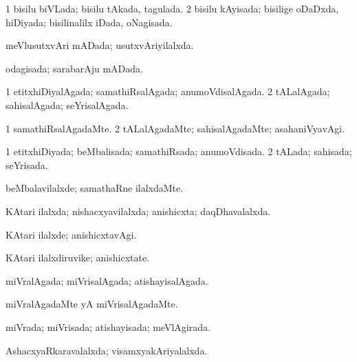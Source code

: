 \bentry
{} 
\gl{\gu}
\expl{}
\bmng
\bnum
\num{1} bisilu biVLada; bisilu tAkada, tagulada. 
\num{2} bisilu kAyisada; bisilige oDaDxda, hiDiyada; bisilinalilx iDada, oNagisada. 
\enum
\emng
\eentry

\bentry
{} 
\gl{\gu}
\expl{}
\bmng
meVlusutxvAri mADada; usutxvAriyilalxda. 
\emng
\eentry

\bentry
{} 
\gl{\gu}
\expl{}
\bmng
odagisada; sarabarAju mADada. 
\emng
\eentry

\bentry
{} 
\gl{\gu}
\expl{}
\bmng
\bnum
\num{1} etitxhiDiyalAgada; samathiRsalAgada; anumoVdisalAgada. 
\num{2} tALalAgada; sahisalAgada; seYrisalAgada. 
\enum
\emng
\eentry

\bentry
{} 
\gl{\kirxvi}
\bmng
\bnum
\num{1} samathiRsalAgadaMte. 
\num{2} tALalAgadaMte; sahisalAgadaMte; asahaniVyavAgi. 
\enum
\emng
\eentry

\bentry
{} 
\gl{\gu}
\expl{}
\bmng
\bnum
\num{1} etitxhiDiyada; beMbalisada; samathiRsada; anumoVdisada. 
\num{2} tALada; sahisada; seYrisada. 
\enum
\emng
\eentry

\bentry
{} 
\gl{\kirxvi}
\expl{}
\bmng
beMbalavilalxde; samathaRne ilalxdaMte. 
\emng
\eentry

\bentry
{} 
\gl{\gu}
\expl{}
\bmng
KAtari ilalxda; nishacxyavilalxda; anishicxta; daqDhavalalxda. 
\emng
\eentry

\bentry
{} 
\gl{\kirxvi}
\expl{}
\bmng
KAtari ilalxde; anishicxtavAgi. 
\emng
\eentry

\bentry
{} 
\gl{\nA}
\expl{}
\bmng
KAtari ilalxdiruvike; anishicxtate. 
\emng
\eentry

\bentry
{} 
\gl{\gu}
\expl{}
\bmng
miVralAgada; miVrisalAgada; atishayisalAgada. 
\emng
\eentry

\bentry
{} 
\gl{\kirxvi}
\expl{}
\bmng
miVralAgadaMte yA miVrisalAgadaMte. 
\emng
\eentry

\bentry
{} 
\gl{\gu}
\expl{}
\bmng
miVrada; miVrisada; atishayisada; meVlAgirada. 
\emng
\eentry

\bentry
{} 
\gl{\gu}
\expl{}
\bmng
AshacxyaRkaravalalxda; visamxyakAriyalalxda. 
\emng
\eentry

